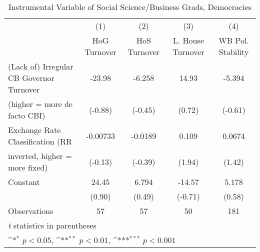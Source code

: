\begin{table}[htbp]\centering
\def\sym#1{\ifmmode^{#1}\else\(^{#1}\)\fi}
\caption{Instrumental Variable of Social Science/Business Grads, Democracies \label{demIfivs4}}
\begin{tabular}{l*{4}{c}}
\toprule
                                        &\multicolumn{1}{c}{(1)}&\multicolumn{1}{c}{(2)}&\multicolumn{1}{c}{(3)}&\multicolumn{1}{c}{(4)}\\
                                        &\multicolumn{1}{c}{HoG Turnover}&\multicolumn{1}{c}{HoS Turnover}&\multicolumn{1}{c}{L. House Turnover}&\multicolumn{1}{c}{WB Pol. Stability}\\
\midrule
(Lack of) Irregular CB Governor Turnover&   -23.98         &   -6.258         &    14.93         &   -5.394         \\
(higher = more de facto CBI)            &  (-0.88)         &  (-0.45)         &   (0.72)         &  (-0.61)         \\
\addlinespace
Exchange Rate Classification (RR        & -0.00733         &  -0.0189         &    0.109         &   0.0674         \\
inverted, higher = more fixed)          &  (-0.13)         &  (-0.39)         &   (1.94)         &   (1.42)         \\
\addlinespace
Constant                                &    24.45         &    6.794         &   -14.57         &    5.178         \\
                                        &   (0.90)         &   (0.49)         &  (-0.71)         &   (0.58)         \\
\midrule
Observations                            &       57         &       57         &       50         &      181         \\
\bottomrule
\multicolumn{5}{l}{\footnotesize \textit{t} statistics in parentheses}\\
\multicolumn{5}{l}{\footnotesize \sym{*} \(p<0.05\), \sym{**} \(p<0.01\), \sym{***} \(p<0.001\)}\\
\end{tabular}
\end{table}
